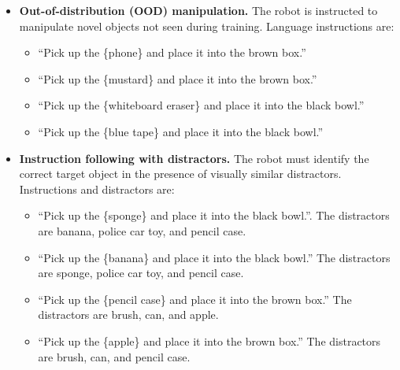 \begin{itemize}
    \item \textbf{Out-of-distribution (OOD) manipulation.} 
    The robot is instructed to manipulate novel objects not seen during training. Language instructions are:
    \begin{itemize}
        \item ``Pick up the \{phone\} and place it into the brown box.''
        \item ``Pick up the \{mustard\} and place it into the brown box.''
        \item ``Pick up the \{whiteboard eraser\} and place it into the black bowl.''
        \item ``Pick up the \{blue tape\} and place it into the black bowl.''
    \end{itemize}

    \item \textbf{Instruction following with distractors.} 
    The robot must identify the correct target object in the presence of visually similar distractors. Instructions and distractors are:
    \begin{itemize}
        \item ``Pick up the \{sponge\} and place it into the black bowl.''. The distractors are banana, police car toy, and pencil case.
        \item ``Pick up the \{banana\} and place it into the black bowl.'' The distractors are sponge, police car toy, and pencil case.
        \item ``Pick up the \{pencil case\} and place it into the brown box.'' The distractors are brush, can, and apple.
        \item ``Pick up the \{apple\} and place it into the brown box.'' The distractors are brush, can, and pencil case.
    \end{itemize}
\end{itemize}








